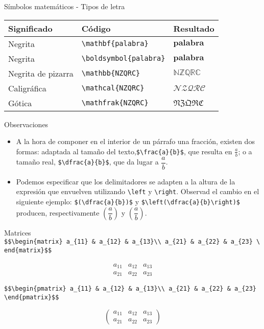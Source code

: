 \documentclass[
  ignorenonframetext,
]{beamer}
\begin{document}
\begin{frame}[fragile]{Símbolos matemáticos - Tipos de letra}
\protect\hypertarget{suxedmbolos-matemuxe1ticos---tipos-de-letra}{}
\begin{longtable}[]{@{}lll@{}}
\toprule
Significado & Código & Resultado \\
\midrule
\endhead
Negrita & \texttt{\textbackslash{}mathbf\{palabra\}} &
\(\mathbf{palabra}\) \\
Negrita & \texttt{\textbackslash{}boldsymbol\{palabra\}} &
\(\boldsymbol{palabra}\) \\
Negrita de pizarra & \texttt{\textbackslash{}mathbb\{NZQRC\}} &
\(\mathbb{NZQRC}\) \\
Caligráfica & \texttt{\textbackslash{}mathcal\{NZQRC\}} &
\(\mathcal{NZQRC}\) \\
Gótica & \texttt{\textbackslash{}mathfrak\{NZQRC\}} &
\(\mathfrak{NZQRC}\) \\
\bottomrule
\end{longtable}
\end{frame}

\begin{frame}[fragile]{Observaciones}
\protect\hypertarget{observaciones}{}
\begin{itemize}
\item
  A la hora de componer en el interior de un párrafo una fracción,
  existen dos formas: adaptada al tamaño del
  texto,\texttt{\$\textbackslash{}frac\{a\}\{b\}\$}, que resulta en
  \(\frac{a}{b}\); o a tamaño real,
  \texttt{\$\textbackslash{}dfrac\{a\}\{b\}\$}, que da lugar a
  \(\dfrac{a}{b}\).
\item
  Podemos especificar que los delimitadores se adapten a la altura de la
  expresión que envuelven utilizando \texttt{\textbackslash{}left} y
  \texttt{\textbackslash{}right}. Observad el cambio en el siguiente
  ejemplo: \texttt{\$(\textbackslash{}dfrac\{a\}\{b\})\$} y
  \texttt{\$\textbackslash{}left(\textbackslash{}dfrac\{a\}\{b\}\textbackslash{}right)\$}
  producen, respectivamente \((\dfrac{a}{b})\) y
  \(\left(\dfrac{a}{b}\right)\).
\end{itemize}
\end{frame}

\begin{frame}[fragile]{Matrices}
\protect\hypertarget{matrices}{}
\texttt{\$\$\textbackslash{}begin\{matrix\}\ a\_\{11\}\ \&\ a\_\{12\}\ \&\ a\_\{13\}\textbackslash{}\textbackslash{}\ a\_\{21\}\ \&\ a\_\{22\}\ \&\ a\_\{23\}\ \textbackslash{}end\{matrix\}\$\$}

\[\begin{matrix}
a_{11} & a_{12} & a_{13}\\
a_{21} & a_{22} & a_{23}
\end{matrix}\]

\texttt{\$\$\textbackslash{}begin\{pmatrix\}\ a\_\{11\}\ \&\ a\_\{12\}\ \&\ a\_\{13\}\textbackslash{}\textbackslash{}\ a\_\{21\}\ \&\ a\_\{22\}\ \&\ a\_\{23\}\ \textbackslash{}end\{pmatrix\}\$\$}

\[\begin{pmatrix}
a_{11} & a_{12} & a_{13}\\
a_{21} & a_{22} & a_{23}
\end{pmatrix}\]
\end{frame}
\end{document}
